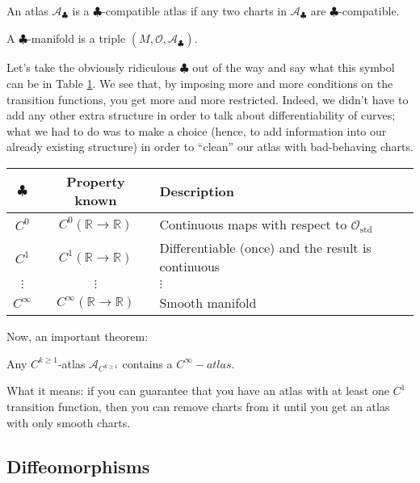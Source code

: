 \begin{definition}
    An atlas $\mathcal{A}_\clubsuit$ is a $\clubsuit$-compatible atlas if any two charts in $\mathcal{A}_\clubsuit$ are $\clubsuit$-compatible.
\end{definition}

\begin{definition}
    A $\clubsuit$-manifold is a triple $(M, \mathcal{O}, \mathcal{A}_\clubsuit)$.
\end{definition}

Let's take the obviously ridiculous $\clubsuit$ out of the way and say what this symbol can be in Table \ref{tab:flower}. We see that, by imposing more and more conditions on the transition functions, you get more and more restricted. Indeed, we didn't have to add any other extra structure in order to talk about differentiability of curves; what we had to do was to make a choice (hence, to add information into our already existing structure) in order to ``clean'' our atlas with bad-behaving charts. 

\begin{table}[ht]
    \centering
    \begin{tabular}{c|c|l}
    $\clubsuit$ & Property known & Description \\ \hline \hline
    $C^0$ & $C^0(\mathbb{R} \longrightarrow \mathbb{R})$ & Continuous maps with respect to $\mathcal{O}_{\text{std}}$ \\
    $C^1$ & $C^1(\mathbb{R} \longrightarrow \mathbb{R})$ & Differentiable (once) and the result is continuous \\
    $\vdots$ & $\vdots$ & $\vdots$ \\
    $C^\infty$ & $C^\infty(\mathbb{R} \longrightarrow \mathbb{R})$ & Smooth manifold \\ \hline
    \end{tabular}
    \label{tab:flower}
\end{table}

Now, an important theorem:

\begin{theorem}
    Any $C^{k \geq 1}$-atlas $\mathcal{A}_{C^{k \geq 1}}$ contains a $C^{\infty}-atlas$.
\end{theorem}

What it means: if you can guarantee that you have an atlas with at least one $C^1$ transition function, then you can remove charts from it until you get an atlas with only smooth charts.

\subsection{Diffeomorphisms}

